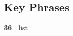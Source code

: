 		
\subsection{Key Phrases} %
	\label{ZION-PHRASES}

	\begin{compactdesc}
		\item[mount Zion] \textbf{36} | list %
	\end{compactdesc}
	


	
		
